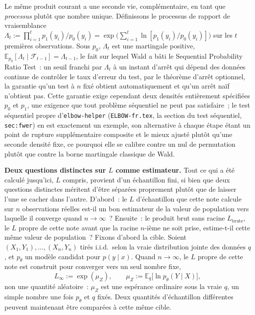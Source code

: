 \documentclass[11pt]{article}
\newcommand{\code}[1]{\texttt{#1}}
\begin{document}
Le même produit courant a une seconde vie, complémentaire, en tant que
\emph{processus} plutôt que nombre unique. Définissons le processus de
rapport de vraisemblance $\Lambda_t := \prod_{i=1}^t
p_1(y_i)/p_0(y_i) = \exp\big(\sum_{i=1}^t
\ln[p_1(y_i)/p_0(y_i)]\big)$ sur les $t$ premières observations. Sous
$p_0$, $\Lambda_t$ est une martingale positive, $\mathbb
E_{p_0}[\Lambda_t \mid \mathcal F_{t-1}] = \Lambda_{t-1}$, le fait sur
lequel Wald \citep{wald1945} a bâti le Sequential Probability Ratio
Test~: un seuil franchi par $\Lambda_t$ à un instant d'arrêt qui
dépend des données continue de contrôler le taux d'erreur du test, par
le théorème d'arrêt optionnel, la garantie qu'un test à $n$ fixé
obtient automatiquement et qu'un arrêt naïf n'obtient pas. Cette
garantie exige cependant deux densités entièrement spécifiées $p_0$ et
$p_1$, une exigence que tout problème séquentiel ne peut pas
satisfaire~; le test séquentiel propre d'\code{elbow-helper}
(\code{ELBOW-fr.tex}, la section du test séquentiel, \code{sec:fwer})
en est exactement un exemple, son alternative à chaque étape étant un
point de rupture supplémentaire composite et le mieux ajusté plutôt
qu'une seconde densité fixe, ce pourquoi elle se calibre contre un nul
de permutation plutôt que contre la borne martingale classique de
Wald.

\textbf{Deux questions distinctes sur $L$ comme estimateur.} Tout ce
qui a été calculé jusqu'ici, $L$ compris, provient d'un échantillon
fini, si bien que deux questions distinctes méritent d'être séparées
proprement plutôt que de laisser l'une se cacher dans l'autre.
D'abord~: le $L$ d'échantillon que cette note calcule sur $n$
observations réelles est-il un bon estimateur de la valeur de
population vers laquelle il converge quand $n \to \infty$~? Ensuite~:
le produit brut sans racine $L_{\text{brute}}$, le $L$ propre de cette
note avant que la racine $n$-ième ne soit prise, estime-t-il cette même
valeur de population~? Fixons d'abord la cible. Soient $(X_1,Y_1),\dots,
(X_n,Y_n)$ tirés i.i.d.\ selon la vraie distribution jointe des données
$q$, et $p_\theta$ un modèle candidat pour $p(y \mid x)$. Quand $n \to
\infty$, le $L$ propre de cette note est construit pour converger vers
un seul nombre fixe,
$$L_\infty := \exp(\mu_Z), \qquad \mu_Z := \mathbb E_q\big[\ln
p_\theta(Y \mid X)\big],$$
non une quantité aléatoire~: $\mu_Z$ est une espérance ordinaire sous
la vraie $q$, un simple nombre une fois $p_\theta$ et $q$ fixés. Deux
quantités d'échantillon différentes peuvent maintenant être comparées
à cette même cible.
\end{document}
